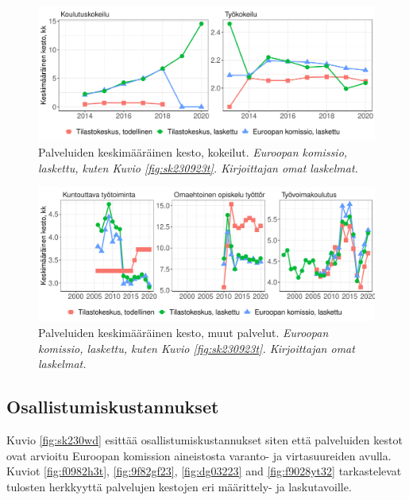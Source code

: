 \documentclass[12pt]{article}
\newcommand{\captionselite}[1] {\textit{\footnotesize{#1}}}
\newcommand{\seliteduration}[1] {}
\begin{document}
\begin{figure}
\centering
\includegraphics[scale = 0.6]{../plots/durations/kokeilu.pdf}
\caption{Palveluiden keskimääräinen kesto, kokeilut. \captionselite{\protect \seliteduration{kokeilu} Euroopan komissio, laskettu, kuten Kuvio \ref{fig:sk230923t}. Kirjoittajan omat laskelmat.}}
   \label{fig:d923t23}
\end{figure}

\begin{figure}
\centering
\includegraphics[scale = 0.6]{../plots/durations/muu.pdf}
\caption{Palveluiden keskimääräinen kesto, muut palvelut. \captionselite{\protect \seliteduration{muu} Euroopan komissio, laskettu, kuten Kuvio \ref{fig:sk230923t}. Kirjoittajan omat laskelmat.}}
   \label{fig:kdswdfwe}
\end{figure}



\subsection{Osallistumiskustannukset}

Kuvio \ref{fig:sk230wd} esittää osallistumiskustannukset siten että palveluiden kestot ovat arvioitu Euroopan komission aineistosta varanto- ja virtasuureiden avulla. Kuviot \ref{fig:f0982h3t}, \ref{fig:9f82gf23}, \ref{fig:dg03223} and \ref{fig:f9028yt32} tarkastelevat tulosten herkkyyttä palvelujen kestojen eri määrittely- ja laskutavoille. 
\end{document}
